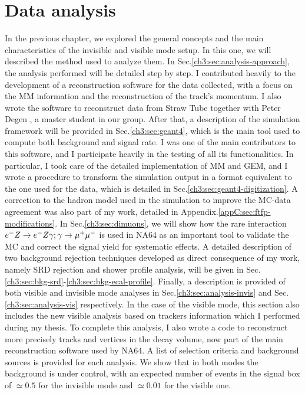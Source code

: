
\newcommand{\pdirthree}{chapters/plots/chapter3}

\chapter{Data analysis} %
\label{chapter3} %


In the previous chapter, we explored the general concepts and the main characteristics of the invisible and visible mode setup. In this one, we will described the method used to analyze them. In Sec.\ref{ch3:sec:analysis-approach}, the analysis performed will be detailed step by step. I contributed heavily to the development of a reconstruction software for the data collected, with a focus on the MM information and the reconstruction of the track's momentum. I also wrote the software to reconstruct data from Straw Tube together with Peter Degen \cite{pdegen-thesis}, a master student in our group. After that, a description of the simulation framework will be provided in Sec.\ref{ch3:sec:geant4}, which is the main tool used to compute both background and signal rate. I was one of the main contributors to this software, and I participate heavily in the testing of all its functionalities. In particular, I took care of the detailed implementation of MM and GEM, and I wrote a procedure to transform the simulation output in a format equivalent to the one used for the data, which is detailed in Sec.\ref{ch3:sec:geant4-digitization}. A correction to the hadron model used in the simulation to improve the MC-data agreement was also part of my work, detailed in Appendix.\ref{appC:sec:ftfp-modifications}.
In Sec.\ref{ch3:sec:dimuons}, we will show how the rare interaction $e^- Z \to e^- Z \gamma; \gamma \to \mu^+ \mu^-$ is used in NA64 as an important tool to validate the MC and correct the signal yield for systematic effects.
A detailed description of two background rejection techniques developed as direct consequence of my work, namely SRD rejection and shower profile analysis, will be given in Sec.\ref{ch3:sec:bkg-srd}-\ref{ch3:sec:bkg-ecal-profile}.
Finally, a description is provided of both visible and invisible mode analyses in Sec.\ref{ch3:sec:analysis-invis} and Sec.\ref{ch3:sec:analysis-vis} respectively. In the case of the visible mode, this section also includes the new visible analysis based on trackers information which I performed during my thesis. To complete this analysis, I also wrote a code to reconstruct more precisely tracks and vertices in the decay volume, now part of the main reconstruction software used by NA64.
A list of selection criteria and background sources is provided for each analysis. We show that in both modes the background is under control, with an expected number of events in the signal box of $\simeq 0.5$ for the invisible mode and $\simeq 0.01$ for the visible one.


